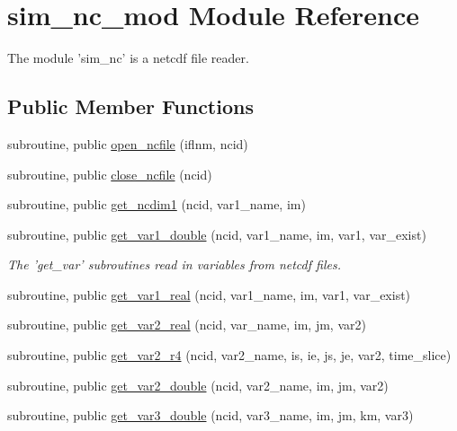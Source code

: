 \section{sim\-\_\-nc\-\_\-mod Module Reference}
\label{classsim__nc__mod}


The module 'sim\-\_\-nc' is a netcdf file reader.  


\subsection*{Public Member Functions}
\begin{DoxyCompactItemize}
\item 
subroutine, public \hyperlink{classsim__nc__mod_aba132435cdbc967cae6289d8de91c642}{open\-\_\-ncfile} (iflnm, ncid)
\item 
subroutine, public \hyperlink{classsim__nc__mod_a0723aaca20b4f506ff134f191c9c2773}{close\-\_\-ncfile} (ncid)
\item 
subroutine, public \hyperlink{classsim__nc__mod_ae7821440ac92334fb40992fd22fb611c}{get\-\_\-ncdim1} (ncid, var1\-\_\-name, im)
\item 
subroutine, public \hyperlink{classsim__nc__mod_ace9b6fd17d5ca314e8ad1cd4dfbeac4b}{get\-\_\-var1\-\_\-double} (ncid, var1\-\_\-name, im, var1, var\-\_\-exist)
\begin{DoxyCompactList}\small\item\em The 'get\-\_\-var' subroutines read in variables from netcdf files. \end{DoxyCompactList}\item 
subroutine, public \hyperlink{classsim__nc__mod_accbb162bf22e5a5d2b9de65c8db7b3f1}{get\-\_\-var1\-\_\-real} (ncid, var1\-\_\-name, im, var1, var\-\_\-exist)
\item 
subroutine, public \hyperlink{classsim__nc__mod_a0d037f885e13796e5464178753a4f7c0}{get\-\_\-var2\-\_\-real} (ncid, var\-\_\-name, im, jm, var2)
\item 
subroutine, public \hyperlink{classsim__nc__mod_a71d5ab6bff11033a949f0b9bc5a7b5c7}{get\-\_\-var2\-\_\-r4} (ncid, var2\-\_\-name, is, ie, js, je, var2, time\-\_\-slice)
\item 
subroutine, public \hyperlink{classsim__nc__mod_a721aebcb15fd4300ce0f803b1f36e835}{get\-\_\-var2\-\_\-double} (ncid, var2\-\_\-name, im, jm, var2)
\item 
subroutine, public \hyperlink{classsim__nc__mod_ab01af2d9e31aa4fb2eddd4aa0116fdf9}{get\-\_\-var3\-\_\-double} (ncid, var3\-\_\-name, im, jm, km, var3)

\end{DoxyCompactItemize}
